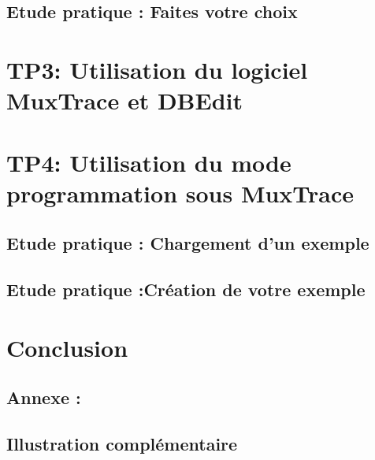 \documentclass{rapportECC}
\begin{document}
\subsection{Etude pratique : Faites votre choix}

\section{TP3: Utilisation du logiciel MuxTrace et DBEdit}

\section{TP4: Utilisation du mode programmation sous MuxTrace}

\subsection{Etude pratique : Chargement d'un exemple}

\subsection{Etude pratique :Création de votre exemple}

\section{Conclusion}

\newpage


\printbibliography

\newpage
\begin{appendices}
\section{Annexe : }
\subsection{Illustration complémentaire}
\end{appendices}
\end{document}
